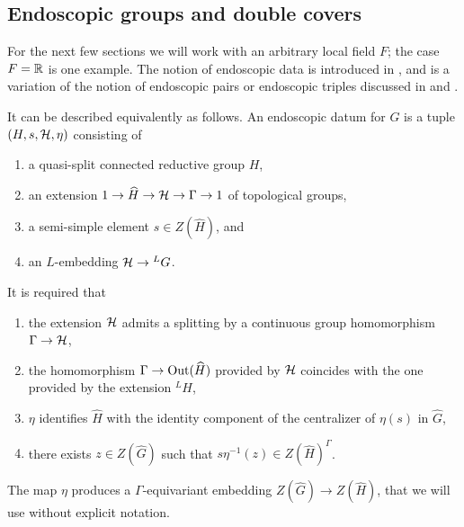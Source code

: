 \documentclass{article}
\theoremstyle{definition}
\numberwithin{equation}{section}
\renewcommand{\-}{\hyp{}}
\begin{document}


\subsection{Endoscopic groups and double covers} \label{sub:covendo}

For the next few sections we will work with an arbitrary local field $F$; the case $F=\mathbb{R}$ is one example. The notion of endoscopic data is introduced in \cite[\S1.2]{LS87}, and is a variation of the notion of endoscopic pairs or endoscopic triples discussed in \cite{Kot84} and \cite{Kot86}.

It can be described equivalently as follows. An endoscopic datum for $G$ is a tuple $(H,s,\mathcal{H},\eta)$ consisting of
\begin{enumerate}[label=(\arabic*)]
	\item a quasi-split connected reductive group $H$,
	\item an extension $1 \to \widehat H \to \mathcal{H} \to \Gamma \to 1$ of topological groups,
	\item a semi-simple element $s \in Z(\hat H)$, and
	\item an $L$\-embedding $\mathcal{H} \to {^LG}$.
\end{enumerate}
It is required that
\begin{enumerate}[label=(\alph*)]
	\item the extension $\mathcal{H}$ admits a splitting by a continuous group homomorphism $\Gamma \to \mathcal{H}$,
	\item the homomorphism $\Gamma \to \textrm{Out}(\widehat H)$ provided by $\mathcal{H}$ coincides with the one provided by the extension $^LH$,
	\item $\eta$ identifies $\hat H$ with the identity component of the centralizer of $\eta(s)$ in $\hat G$,
	\item there exists $z \in Z(\hat G)$ such that $s\eta^{-1}(z) \in Z(\hat H)^\Gamma$.
\end{enumerate}
The map $\eta$ produces a $\Gamma$-equivariant embedding $Z(\hat G) \to Z(\hat H)$, that we will use without explicit notation.
\end{document}
